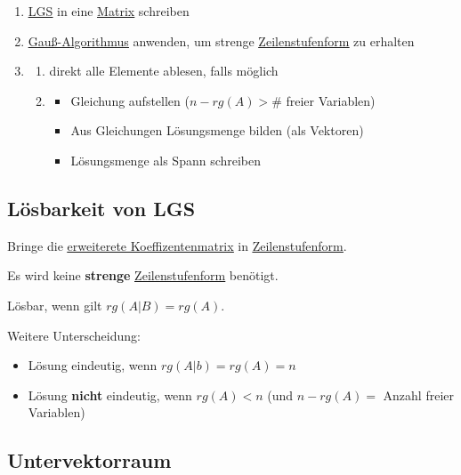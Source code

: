 \documentclass{scrartcl}
\newcommand{\linkTo}[1]{\hyperref[#1]{\underline{#1}}}
\newcommand{\linkToRef}[2][ref]{\hyperref[#1]{\underline{#2}}}
\begin{document}
\begin{enumerate}
\item \linkTo{LGS} in eine \linkTo{Matrix} schreiben
\item \linkToRef[Gauss]{Gauß-Algorithmus} anwenden, um strenge \linkTo{Zeilenstufenform} zu erhalten
\item 
    \begin{enumerate}
        \item direkt alle Elemente ablesen, falls möglich
        \item 
            \begin{itemize}
            \item Gleichung aufstellen ($n-rg(A) > \#$ freier Variablen)
            \item Aus Gleichungen Lösungsmenge bilden (als Vektoren)
            \item Lösungsmenge als Spann schreiben
            \end{itemize}
    \end{enumerate}
\end{enumerate}

\subsection{Lösbarkeit von LGS}

Bringe die \linkTo{erweiterete Koeffizentenmatrix} in \linkTo{Zeilenstufenform}. 

Es wird keine \textbf{strenge} \linkTo{Zeilenstufenform} benötigt.

Lösbar, wenn gilt \linkToRef[Rang]{$rg(A|B) = rg(A)$}.

Weitere Unterscheidung:
\begin{itemize}
\item Lösung eindeutig, wenn $ rg(A|b) = rg(A) = n$
\item Lösung \textbf{nicht} eindeutig, wenn $rg(A) < n$ (und $n - rg(A) = $ Anzahl freier Variablen)
\end{itemize}

\subsection{Untervektorraum}
\end{document}
